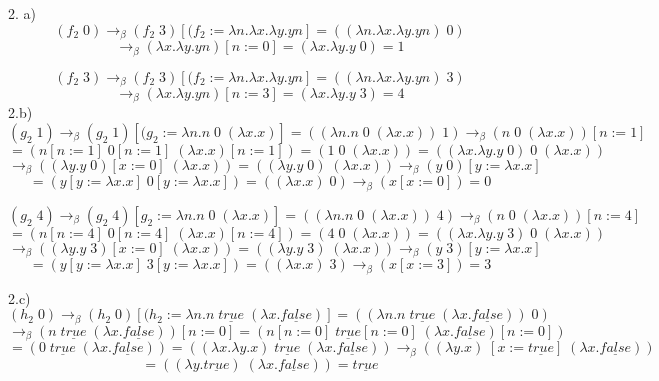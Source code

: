 \documentclass{article}
\begin{document}
\begin{flushleft}
	2. a)
	\[(f_{2} \;0) \rightarrow_{\beta} (f_{2} \;3) [(f_{2} := \lambda n.\lambda x.\lambda y. y n]  =( (\lambda n.\lambda x.\lambda y. y n) \;0 )\]
	\[ \rightarrow_{\beta}(\lambda x.\lambda y. y n)[n := 0] = (\lambda x.\lambda y. y \;0) = 1\]

	\[(f_{2} \;3) \rightarrow_{\beta} (f_{2} \;3) [(f_{2} := \lambda n.\lambda x.\lambda y. y n] = ( (\lambda n.\lambda x.\lambda y. y n) \;3)\]
	\[ \rightarrow_{\beta}(\lambda x.\lambda y. y n)[n := 3] = (\lambda x.\lambda y. y \;3) = 4\]
	2.b)
	\[(g_{2} \;1) \rightarrow_{\beta} (g_{2} \;1) [(g_{2} := \lambda n.n \;0 \;(\lambda x.x)]  =( ( \lambda n.n \;0 \;(\lambda x.x)) \;1) \rightarrow_{\beta} (n \;0 \;(\lambda x.x))[n:=1] \]
	\[ = (n[n := 1]\; 0 [n := 1]  \;  (\lambda x.x) [n := 1]) = (1\;0\;(\lambda x.x)) =( ( \lambda x.\lambda y. y \; 0)\; 0  \; (\lambda x.x))\]
	\[ \rightarrow_{\beta}( ( \lambda y. y \; 0)[x:= 0]  \; (\lambda x.x)) = ( ( \lambda y. y \; 0)\; (\lambda x.x))  \rightarrow_{\beta} (y \; 0) [y:=\lambda x.x] \]
	\[= (y[y:=\lambda x.x] \; 0[y:=\lambda x.x])  = ( (\lambda x.x) \;0)  \rightarrow_{\beta} (x [x := 0] ) = 0\]
	
	\[(g_{2} \;4) \rightarrow_{\beta} (g_{2} \;4) [g_{2} := \lambda n.n \;0 \;(\lambda x.x)]  =( ( \lambda n.n \;0 \;(\lambda x.x)) \;4) \rightarrow_{\beta} (n \;0 \;(\lambda x.x))[n:=4] \]
	\[ = (n[n := 4]\; 0 [n := 4]  \;  (\lambda x.x) [n := 4]) = (4\;0\;(\lambda x.x)) =( ( \lambda x.\lambda y. y \; 3)\; 0  \; (\lambda x.x))\]
	\[ \rightarrow_{\beta}( ( \lambda y. y \; 3)[x:= 0]  \; (\lambda x.x)) = ( ( \lambda y. y \; 3)\; (\lambda x.x))  \rightarrow_{\beta} (y \; 3) [y:=\lambda x.x] \]
	\[= (y[y:=\lambda x.x] \; 3[y:=\lambda x.x])  = ( (\lambda x.x) \;3)  \rightarrow_{\beta} (x [x := 3] ) = 3\]
	
	2.c)
	\[(h_{2} \;0) \rightarrow_{\beta} (h_{2} \;0) [(h_{2} := \lambda n.n  \; \underline {true} \;(\lambda x.  \underline {false})]  =( ( \lambda n.n  \; \underline {true} \;(\lambda x.  \underline 		{false})) \;0 )\]
	\[ \rightarrow_{\beta}(n  \; \underline {true} \;(\lambda x.  \underline {false}))[n := 0] = (n[n := 0]   \; \underline {true}[n := 0]  \;(\lambda x.  \underline {false})[n := 0] )\]
	\[ = (0  \; \underline {true} \;(\lambda x.  \underline {false})) =( (\lambda x.\lambda y. x)\; \underline {true}  \;(\lambda x.  \underline {false}))  \rightarrow_{\beta} ( (\lambda y. x)\; [x:= 		\underline {true} ] \;(\lambda x.  \underline {false})) \]
	\[=((\lambda y.\underline {true})\; (\lambda x.  \underline {false})) = \underline {true}  \]


\end{flushleft}
\end{document}
